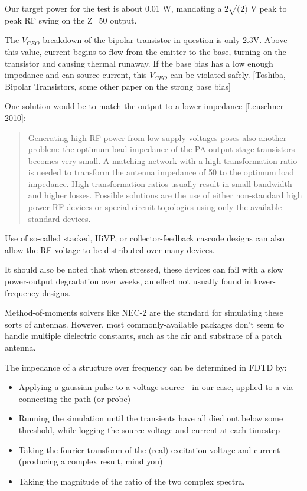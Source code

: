 \documentclass[paper.tex]{subfiles}
\begin{document}
Our target power for the test is about 0.01 W, mandating a $2 \sqrt(2)$ V peak to peak RF swing on the Z=50 output.

The $V_{CEO}$ breakdown of the bipolar transistor in question is only 2.3V. Above this value, current begins to flow from the emitter to the base, turning on the transistor and causing thermal runaway. If the base bias has a low enough impedance and can source current, this $V_{CEO}$ can be violated safely. [Toshiba, Bipolar Transistors, some other paper on the strong base bias]

One solution would be to match the output to a lower impedance [Leuschner 2010]:

\begin{quote}
Generating high RF power from low supply voltages poses also another problem: the optimum load impedance of the PA output stage transistors becomes very small. A matching network with a high transformation ratio is needed to transform the antenna impedance of 50 to the optimum load impedance. High transformation ratios usually result in small bandwidth and higher losses. Possible solutions are the use of either non-standard high power RF devices or special circuit topologies using only the available standard devices.
\end{quote}



Use of so-called stacked, HiVP, or collector-feedback cascode designs can also allow the RF voltage to be distributed over many devices.

It should also be noted that when stressed, these devices can fail with a slow power-output degradation over weeks, an effect not usually found in lower-frequency designs. 

\printbibliography[heading=none, title={}, keyword={amplifier}]




\clearpage
{}

Method-of-moments solvers like NEC-2 are the standard for simulating these sorts of antennas. However, most commonly-available packages don't seem to handle multiple dielectric constants, such as the air and substrate of a patch antenna.

The impedance of a structure over frequency can be determined in FDTD by:

\begin{itemize}
  \item Applying a gaussian pulse to a voltage source - in our case, applied to a via connecting the path (or probe)
  \item Running the simulation until the transients have all died out below some threshold, while logging the source voltage and current at each timestep
  \item Taking the fourier transform of the (real) excitation voltage and current (producing a complex result, mind you)
  \item Taking the magnitude of the ratio of the two complex spectra.
\end{itemize}
\end{document}
